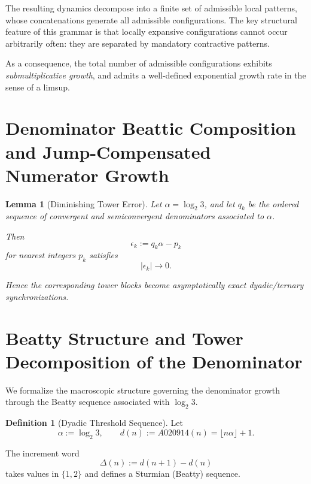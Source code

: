 \documentclass[12pt, oneside]{article}
\numberwithin{equation}{section}
\theoremstyle{definition}
\newtheorem{definition}{Definition}[section]
\theoremstyle{plain}
\newtheorem{lemma}[theorem]{Lemma}
\theoremstyle{remark}
\begin{document}
The resulting dynamics decompose into a finite set of admissible local patterns,
whose concatenations generate all admissible configurations. The key structural
feature of this grammar is that locally expansive configurations cannot occur
arbitrarily often: they are separated by mandatory contractive patterns.

As a consequence, the total number of admissible configurations exhibits
\emph{submultiplicative growth}, and admits a well-defined exponential growth
rate in the sense of a limsup.

\section{Denominator Beattic Composition and Jump-Compensated Numerator Growth}

\begin{lemma}[Diminishing Tower Error]
Let $\alpha=\log_2 3$, and let $q_k$ be the ordered sequence of convergent and semiconvergent denominators associated to $\alpha$.

Then
\[
\epsilon_k := q_k\alpha - p_k
\]
for nearest integers $p_k$ satisfies
\[
|\epsilon_k|\to 0.
\]

Hence the corresponding tower blocks become asymptotically exact dyadic/ternary synchronizations.
\end{lemma}


\section{Beatty Structure and Tower Decomposition of the Denominator}
\label{sec:beatty-towers}

We formalize the macroscopic structure governing the denominator growth
through the Beatty sequence associated with $\log_2 3$.


\begin{definition}[Dyadic Threshold Sequence]
Let
\[
\alpha := \log_2 3,
\qquad
d(n) := A020914(n) = \lfloor n\alpha \rfloor + 1.
\]
\end{definition}

The increment word
\[
\Delta(n) := d(n+1)-d(n)
\]
takes values in $\{1,2\}$ and defines a Sturmian (Beatty) sequence.

\end{document}
